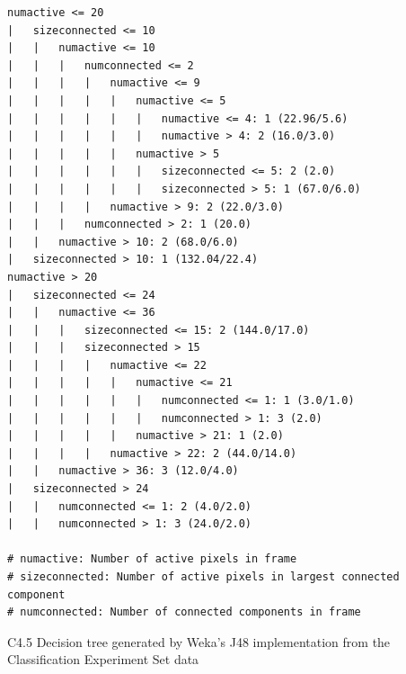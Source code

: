 \documentclass[../thesis/thesis.tex]{subfiles}
\begin{document}
\begin{listing}
\begin{verbatim}
numactive <= 20
|   sizeconnected <= 10
|   |   numactive <= 10
|   |   |   numconnected <= 2
|   |   |   |   numactive <= 9
|   |   |   |   |   numactive <= 5
|   |   |   |   |   |   numactive <= 4: 1 (22.96/5.6)
|   |   |   |   |   |   numactive > 4: 2 (16.0/3.0)
|   |   |   |   |   numactive > 5
|   |   |   |   |   |   sizeconnected <= 5: 2 (2.0)
|   |   |   |   |   |   sizeconnected > 5: 1 (67.0/6.0)
|   |   |   |   numactive > 9: 2 (22.0/3.0)
|   |   |   numconnected > 2: 1 (20.0)
|   |   numactive > 10: 2 (68.0/6.0)
|   sizeconnected > 10: 1 (132.04/22.4)
numactive > 20
|   sizeconnected <= 24
|   |   numactive <= 36
|   |   |   sizeconnected <= 15: 2 (144.0/17.0)
|   |   |   sizeconnected > 15
|   |   |   |   numactive <= 22
|   |   |   |   |   numactive <= 21
|   |   |   |   |   |   numconnected <= 1: 1 (3.0/1.0)
|   |   |   |   |   |   numconnected > 1: 3 (2.0)
|   |   |   |   |   numactive > 21: 1 (2.0)
|   |   |   |   numactive > 22: 2 (44.0/14.0)
|   |   numactive > 36: 3 (12.0/4.0)
|   sizeconnected > 24
|   |   numconnected <= 1: 2 (4.0/2.0)
|   |   numconnected > 1: 3 (24.0/2.0)

# numactive: Number of active pixels in frame
# sizeconnected: Number of active pixels in largest connected component
# numconnected: Number of connected components in frame
\end{verbatim}
\caption{C4.5 Decision tree generated by Weka's J48 implementation from the Classification Experiment Set data}
\label{lst:tree}
\end{listing}
\end{document}

